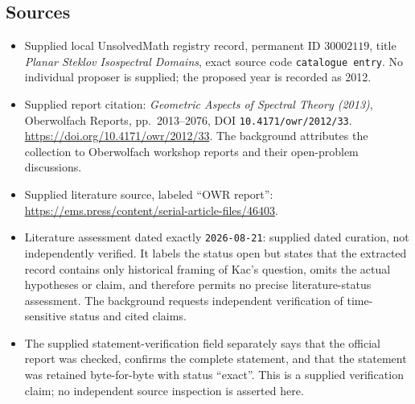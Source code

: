 \documentclass[11pt]{article}
\begin{document}
\subsection{Sources}
\begin{itemize}
\item Supplied local UnsolvedMath registry record, permanent ID \(30002119\), title \emph{Planar Steklov Isospectral Domains}, exact source code \texttt{catalogue entry}. No individual proposer is supplied; the proposed year is recorded as 2012.
\item Supplied report citation: \emph{Geometric Aspects of Spectral Theory (2013)}, Oberwolfach Reports, pp.\ 2013--2076, DOI \texttt{10.4171/owr/2012/33}. \url{https://doi.org/10.4171/owr/2012/33}. The background attributes the collection to Oberwolfach workshop reports and their open-problem discussions.
\item Supplied literature source, labeled ``OWR report'': \url{https://ems.press/content/serial-article-files/46403}.
\item Literature assessment dated exactly \texttt{2026-08-21}: supplied dated curation, not independently verified. It labels the status open but states that the extracted record contains only historical framing of Kac's question, omits the actual hypotheses or claim, and therefore permits no precise literature-status assessment. The background requests independent verification of time-sensitive status and cited claims.
\item The supplied statement-verification field separately says that the official report was checked, confirms the complete statement, and that the statement was retained byte-for-byte with status ``exact''. This is a supplied verification claim; no independent source inspection is asserted here.
\end{itemize}
\end{document}
